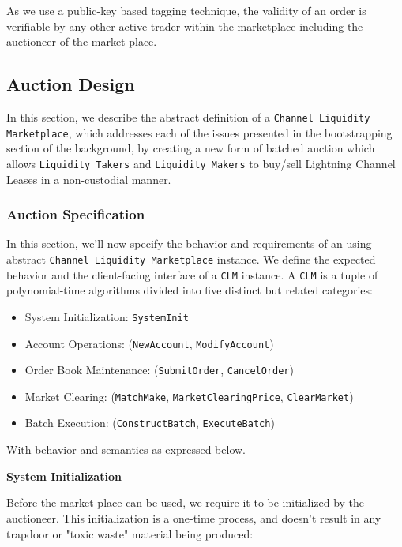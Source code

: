 \documentclass[10pt,a4paper]{article}
\theoremstyle{definition}
\begin{document}
As we use a public-key based tagging technique, the validity of an order is
verifiable by any other active trader within the marketplace including the
auctioneer of the market place.


\subsection{Auction Design}

In this section, we describe the abstract definition of a \texttt{Channel
Liquidity Marketplace}, which addresses each of the issues presented in the
bootstrapping section of the background, by creating a new form of batched
auction which allows \texttt{Liquidity Takers} and \texttt{Liquidity Makers}
to buy/sell Lightning Channel Leases in a non-custodial manner.

\subsubsection{Auction Specification}

In this section, we'll now specify the behavior and requirements of an using abstract
\texttt{Channel Liquidity Marketplace} instance. We define the expected
behavior and the client-facing interface of a \texttt{CLM} instance. A
\texttt{CLM} is a tuple of polynomial-time algorithms divided into five
distinct but related categories:
\begin{itemize}
    \item System Initialization: \texttt{SystemInit}
    \item Account Operations: (\texttt{NewAccount}, \texttt{ModifyAccount})
    \item Order Book Maintenance: (\texttt{SubmitOrder}, \texttt{CancelOrder})
    \item Market Clearing: (\texttt{MatchMake}, \texttt{MarketClearingPrice}, \texttt{ClearMarket})
    \item Batch Execution: (\texttt{ConstructBatch}, \texttt{ExecuteBatch})
\end{itemize}


With behavior and semantics as expressed below. \\

\begin{center}
    \textbf{System Initialization}
\end{center}

Before the market place can be used, we require it to be initialized by the
auctioneer. This initialization is a one-time process, and doesn't result in
any trapdoor or "toxic waste" material being produced: \\
\end{document}
